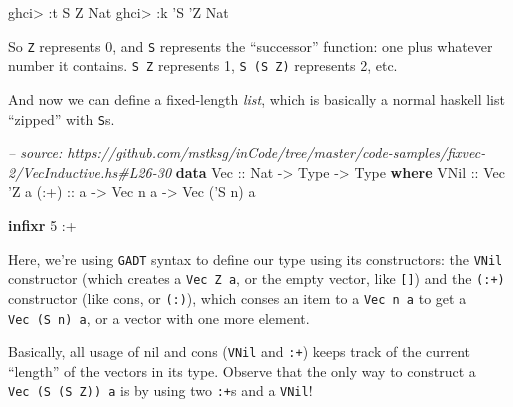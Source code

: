\documentclass[]{article}
\newenvironment{Shaded}{}{}
\newcommand{\KeywordTok}[1]{\textcolor[rgb]{0.00,0.44,0.13}{\textbf{#1}}}
\newcommand{\DataTypeTok}[1]{\textcolor[rgb]{0.56,0.13,0.00}{#1}}
\newcommand{\DecValTok}[1]{\textcolor[rgb]{0.25,0.63,0.44}{#1}}
\newcommand{\CharTok}[1]{\textcolor[rgb]{0.25,0.44,0.63}{#1}}
\newcommand{\CommentTok}[1]{\textcolor[rgb]{0.38,0.63,0.69}{\textit{#1}}}
\newcommand{\OtherTok}[1]{\textcolor[rgb]{0.00,0.44,0.13}{#1}}
\newcommand{\FunctionTok}[1]{\textcolor[rgb]{0.02,0.16,0.49}{#1}}
\newcommand{\NormalTok}[1]{#1}
\begin{document}
\begin{Shaded}
\begin{Highlighting}[]
\NormalTok{ghci}\FunctionTok{>} \FunctionTok{:}\NormalTok{t }\DataTypeTok{S} \DataTypeTok{Z}
\DataTypeTok{Nat}
\NormalTok{ghci}\FunctionTok{>} \FunctionTok{:}\NormalTok{k }\CharTok{'S '}\DataTypeTok{Z}
\DataTypeTok{Nat}
\end{Highlighting}
\end{Shaded}

So \texttt{\textquotesingle{}Z} represents 0, and \texttt{\textquotesingle{}S}
represents the ``successor'' function: one plus whatever number it contains.
\texttt{\textquotesingle{}S\ \textquotesingle{}Z} represents 1,
\texttt{\textquotesingle{}S\ (\textquotesingle{}S\ \textquotesingle{}Z)}
represents 2, etc.

And now we can define a fixed-length \emph{list}, which is basically a normal
haskell list ``zipped'' with \texttt{S}s.

\begin{Shaded}
\begin{Highlighting}[]
\CommentTok{-- source: https://github.com/mstksg/inCode/tree/master/code-samples/fixvec-2/VecInductive.hs#L26-30}
\KeywordTok{data} \DataTypeTok{Vec}\OtherTok{ ::} \DataTypeTok{Nat} \OtherTok{->} \DataTypeTok{Type} \OtherTok{->} \DataTypeTok{Type} \KeywordTok{where}
    \DataTypeTok{VNil}\OtherTok{ ::} \DataTypeTok{Vec} \CharTok{'Z a}
\OtherTok{    (:+) ::}\NormalTok{ a }\OtherTok{->} \DataTypeTok{Vec}\NormalTok{ n a }\OtherTok{->} \DataTypeTok{Vec}\NormalTok{ (}\CharTok{'S n) a}

\KeywordTok{infixr} \DecValTok{5} \FunctionTok{:+}
\end{Highlighting}
\end{Shaded}

Here, we're using \texttt{GADT} syntax to define our type using its
constructors: the \texttt{VNil} constructor (which creates a
\texttt{Vec\ \textquotesingle{}Z\ a}, or the empty vector, like \texttt{{[}{]}})
and the \texttt{(:+)} constructor (like cons, or \texttt{(:)}), which conses an
item to a \texttt{Vec\ n\ a} to get a \texttt{Vec\ (\textquotesingle{}S\ n)\ a},
or a vector with one more element.

Basically, all usage of nil and cons (\texttt{VNil} and \texttt{:+}) keeps track
of the current ``length'' of the vectors in its type. Observe that the only way
to construct a
\texttt{Vec\ (\textquotesingle{}S\ (\textquotesingle{}S\ \textquotesingle{}Z))\ a}
is by using two \texttt{:+}s and a \texttt{VNil}!
\end{document}
